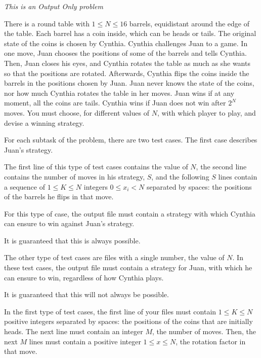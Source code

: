 \documentclass[12pt]{scrartcl}
\begin{document}
    
    {\itshape This is an Output Only problem}
    
    \vspace{10pt}

    There is a round table with $1 \le N \le 16$ barrels, equidistant around the edge of the table. Each barrel has a coin inside, which can be heads or tails. The original state of the coins is chosen by Cynthia. Cynthia challenges Juan to a game. In one move, Juan chooses the positions of some of the barrels and tells Cynthia. Then, Juan closes his eyes, and Cynthia rotates the table as much as she wants so that the positions are rotated. Afterwards, Cynthia flips the coins inside the barrels in the positions chosen by Juan. Juan never knows the state of the coins, nor how much Cynthia rotates the table in her moves. Juan wins if at any moment, all the coins are tails. Cynthia wins if Juan does not win after $2^N$ moves. 
    You must choose, for different values of $N$, with which player to play, and devise a winning strategy.
    

    For each subtask of the problem, there are two test cases. The first case describes Juan's strategy. 

    The first line of this type of test cases contains the value of $N$, the second line contains the number of moves in his strategy, $S$, and the following $S$ lines contain a sequence of $1 \le K \le N$ integers $0 \le x_i < N$ separated by spaces: the positions of the barrels he flips in that move.

    For this type of case, the output file must contain a strategy with which Cynthia can ensure to win against Juan's strategy.

    It is guaranteed that this is always possible.

    The other type of test cases are files with a single number, the value of $N$. In these test cases, the output file must contain a strategy for Juan, with which he can ensure to win, regardless of how Cynthia plays.
    
    It is guaranteed that this will not always be possible. 

    

        In the first type of test cases, the first line of your files must contain $1 \le K \le N$ positive integers separated by spaces: the positions of the coins that are initially heads. The next line must contain an integer $M$, the number of moves. Then, the next $M$ lines must contain a positive integer $1 \le x \le N$, the rotation factor in that move. 
\end{document}
